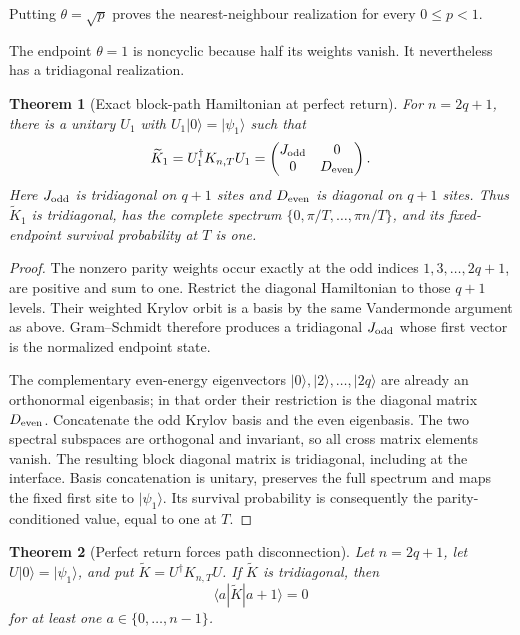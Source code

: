 \documentclass[12pt]{article}
\newtheorem{theorem}{Theorem}[section]
\begin{document}
Putting \(\theta=\sqrt p\) proves the nearest-neighbour realization for
every \(0\leq p<1\).

The endpoint \(\theta=1\) is noncyclic because half its weights vanish.
It nevertheless has a tridiagonal realization.

\begin{theorem}[Exact block-path Hamiltonian at perfect return]
For \(n=2q+1\), there is a unitary \(U_1\) with
\(U_1|0\rangle=|\psi_1\rangle\) such that
\[
 \widetilde K_1=U_1^\dagger K_{n,T}U_1
 =
 \begin{pmatrix}
   J_{\rm odd}&0\\
   0&D_{\rm even}
 \end{pmatrix}.
\]
Here \(J_{\rm odd}\) is tridiagonal on \(q+1\) sites and
\(D_{\rm even}\) is diagonal on \(q+1\) sites. Thus
\(\widetilde K_1\) is tridiagonal, has the complete spectrum
\(\{0,\pi/T,\ldots,\pi n/T\}\), and its fixed-endpoint survival
probability at \(T\) is one.
\end{theorem}

\begin{proof}
The nonzero parity weights occur exactly at the odd indices
\(1,3,\ldots,2q+1\), are positive and sum to one. Restrict the diagonal
Hamiltonian to those \(q+1\) levels. Their weighted Krylov orbit is a basis
by the same Vandermonde argument as above. Gram--Schmidt therefore produces
a tridiagonal \(J_{\rm odd}\) whose first vector is the normalized endpoint
state.

The complementary even-energy eigenvectors
\(|0\rangle,|2\rangle,\ldots,|2q\rangle\) are already an orthonormal
eigenbasis; in that order their restriction is the diagonal matrix
\(D_{\rm even}\). Concatenate the odd Krylov basis and the even eigenbasis.
The two spectral subspaces are orthogonal and invariant, so all cross
matrix elements vanish. The resulting block diagonal matrix is
tridiagonal, including at the interface. Basis concatenation is unitary,
preserves the full spectrum and maps the fixed first site to
\(|\psi_1\rangle\). Its survival probability is consequently the
parity-conditioned value, equal to one at \(T\).
\end{proof}

\begin{theorem}[Perfect return forces path disconnection]
Let \(n=2q+1\), let \(U|0\rangle=|\psi_1\rangle\), and put
\(\widetilde K=U^\dagger K_{n,T}U\). If \(\widetilde K\) is tridiagonal,
then
\[
 \langle a|\widetilde K|a+1\rangle=0
\]
for at least one \(a\in\{0,\ldots,n-1\}\).
\end{theorem}
\end{document}
